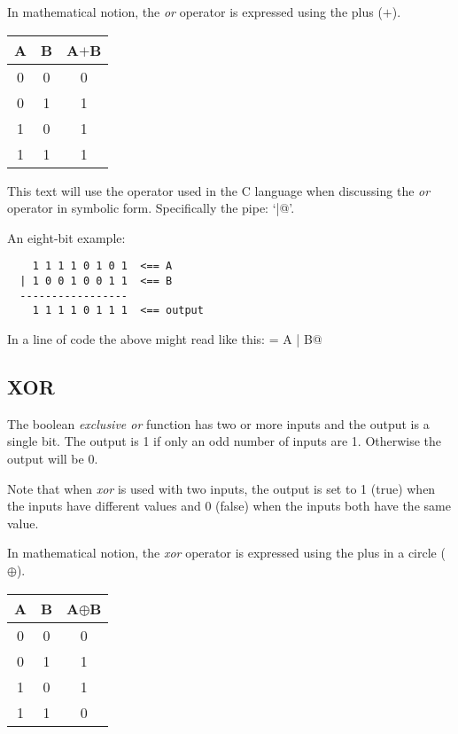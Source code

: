 In mathematical notion, the {\em or} operator is expressed using the plus 
($+$).  

\begin{center}
\begin{tabular}{cc|c}
A & B & A$+$B \\
\hline
0 & 0 & 0 \\
0 & 1 & 1 \\
1 & 0 & 1 \\
1 & 1 & 1 \\
\end{tabular}
\end{center}

This text will use the operator used in the C language when discussing
the {\em or}  operator in symbolic form.  Specifically the pipe: `\verb@|@'.

An eight-bit example:

\begin{verbatim}
    1 1 1 1 0 1 0 1  <== A
  | 1 0 0 1 0 0 1 1  <== B
  -----------------
    1 1 1 1 0 1 1 1  <== output
\end{verbatim}

In a line of code the above might read like this: \verb@output = A | B@

\subsection{XOR}

The boolean {\em exclusive or} function has two or more inputs and the 
output is a single bit.  The output is 1 if only an odd number of inputs 
are 1. Otherwise the output will be 0.

Note that when {\em xor} is used with two inputs, the output
is set to 1 (true) when the inputs have different values and 0 
(false) when the inputs both have the same value.

In mathematical notion, the {\em xor} operator is expressed using the plus
in a circle ($\oplus$).

\begin{center}
\begin{tabular}{cc|c}
A & B & A$\oplus{}$B \\
\hline
0 & 0 & 0 \\
0 & 1 & 1 \\
1 & 0 & 1 \\
1 & 1 & 0 \\
\end{tabular}
\end{center}


